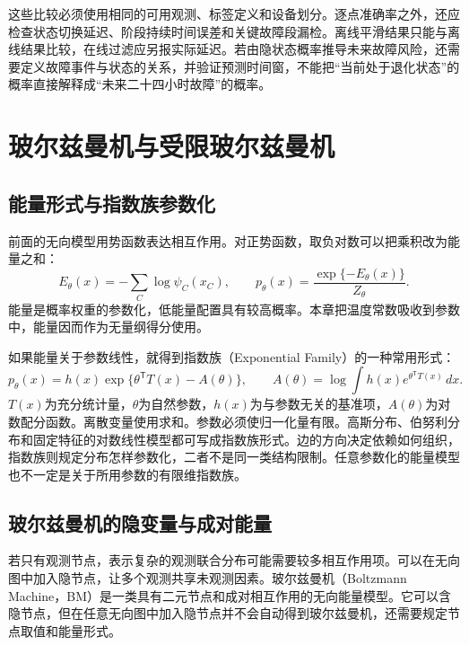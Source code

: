 这些比较必须使用相同的可用观测、标签定义和设备划分。逐点准确率之外，还应检查状态切换延迟、阶段持续时间误差和关键故障段漏检。离线平滑结果只能与离线结果比较，在线过滤应另报实际延迟。若由隐状态概率推导未来故障风险，还需要定义故障事件与状态的关系，并验证预测时间窗，不能把“当前处于退化状态”的概率直接解释成“未来二十四小时故障”的概率。

\section{玻尔兹曼机与受限玻尔兹曼机}
\subsection{能量形式与指数族参数化}
前面的无向模型用势函数表达相互作用。对正势函数，取负对数可以把乘积改为能量之和：
\begin{equation}
 E_\theta(x)=-\sum_C\log\psi_C(x_C),\qquad
 p_\theta(x)=\frac{\exp\{-E_\theta(x)\}}{Z_\theta}.
 \label{eq:bayes-gibbs-energy}
\end{equation}
能量是概率权重的参数化，低能量配置具有较高概率。本章把温度常数吸收到参数中，能量因而作为无量纲得分使用。

如果能量关于参数线性，就得到指数族（Exponential Family）的一种常用形式：
\begin{equation}
 p_\theta(x)=h(x)\exp\{\theta^{\mathsf T}T(x)-A(\theta)\},
 \qquad A(\theta)=\log\int h(x)e^{\theta^{\mathsf T}T(x)}\,dx.
 \label{eq:bayes-exponential-family}
\end{equation}
$T(x)$为充分统计量，$\theta$为自然参数，$h(x)$为与参数无关的基准项，$A(\theta)$为对数配分函数。离散变量使用求和。参数必须使归一化量有限。高斯分布、伯努利分布和固定特征的对数线性模型都可写成指数族形式。边的方向决定依赖如何组织，指数族则规定分布怎样参数化，二者不是同一类结构限制。任意参数化的能量模型也不一定是关于所用参数的有限维指数族。

\subsection{玻尔兹曼机的隐变量与成对能量}
若只有观测节点，表示复杂的观测联合分布可能需要较多相互作用项。可以在无向图中加入隐节点，让多个观测共享未观测因素。玻尔兹曼机（Boltzmann Machine，BM）是一类具有二元节点和成对相互作用的无向能量模型\cite{bishop2006pattern}。它可以含隐节点，但在任意无向图中加入隐节点并不会自动得到玻尔兹曼机，还需要规定节点取值和能量形式。

